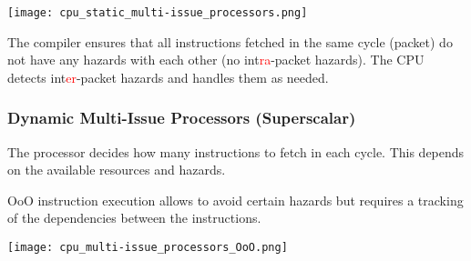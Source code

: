 \begin{multicols*}{3}
    \texttt{[image: cpu\_static\_multi-issue\_processors.png]}

    The compiler ensures that all instructions fetched in the same cycle (packet) do not have any hazards with each other (no int\textcolor{red}{ra}-packet hazards). The CPU detects int\textcolor{red}{er}-packet hazards and handles them as needed. 

    \subsubsection{Dynamic Multi-Issue Processors (Superscalar)}
    The processor decides how many instructions to fetch in each cycle. This depends on the available resources and hazards. 
    \newpar{}

    OoO instruction execution allows to avoid certain hazards but requires a tracking of the dependencies between the instructions.

    \texttt{[image: cpu\_multi-issue\_processors\_OoO.png]}

\end{multicols*}
